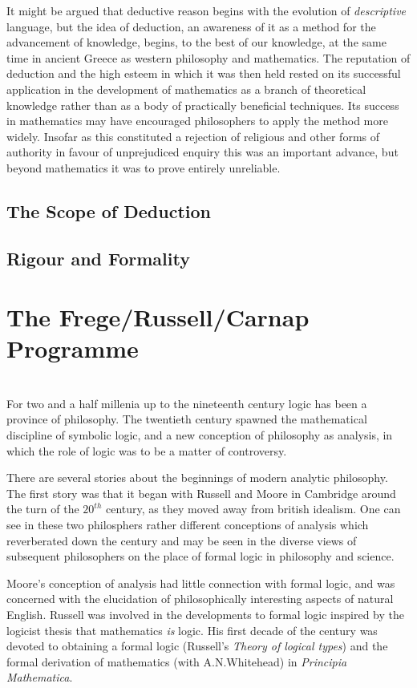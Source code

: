 It might be argued that deductive reason begins with the evolution of \emph{descriptive} language, but the idea of deduction, an awareness of it as a method for the advancement of knowledge, begins, to the best of our knowledge, at the same time in ancient Greece as western philosophy and mathematics.
The reputation of deduction and the high esteem in which it was then held rested on its successful application in the development of mathematics as a branch of theoretical knowledge rather than as a body of practically beneficial techniques.
Its success in mathematics may have encouraged philosophers to apply the method more widely.
Insofar as this constituted a rejection of religious and other forms of authority in favour of unprejudiced enquiry this was an important advance, but beyond mathematics it was to prove entirely unreliable.

\subsection{The Scope of Deduction}

\subsection{Rigour and Formality}


\section{The Frege/Russell/Carnap Programme}

\section{}



For two and a half millenia up to the nineteenth century logic has been a province of philosophy.
The twentieth century spawned the mathematical discipline of symbolic logic, and a new conception of philosophy as analysis, in which the role of logic was to be a matter of controversy.

There are several stories about the beginnings of modern analytic philosophy.
The first story was that it began with Russell and Moore in Cambridge around the turn of the $20^{th}$ century, as they moved away from british idealism.
One can see in these two philosphers rather different conceptions of analysis which reverberated down the century and may be seen in the diverse views of subsequent philosophers on the place of formal logic in philosophy and science.

Moore's conception of analysis had little connection with formal logic, and was concerned with the elucidation of philosophically interesting aspects of natural English.
Russell was involved in the developments to formal logic inspired by the logicist thesis that mathematics \emph{is} logic.
His first decade of the century was devoted to obtaining a formal logic (Russell's \emph{Theory of logical types}\cite{russell1908}) and the formal derivation of mathematics (with A.N.Whitehead) in \emph{Principia Mathematica}\cite{russell10}.
